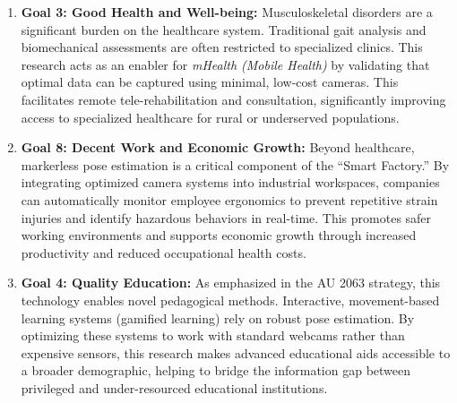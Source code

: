 \begin{enumerate}
    \item \textbf{Goal 3: Good Health and Well-being:}
    Musculoskeletal disorders are a significant burden on the healthcare system. Traditional gait analysis and biomechanical assessments are often restricted to specialized clinics. This research acts as an enabler for \textit{mHealth (Mobile Health)} by validating that optimal data can be captured using minimal, low-cost cameras. This facilitates remote tele-rehabilitation and consultation, significantly improving access to specialized healthcare for rural or underserved populations.

    \item \textbf{Goal 8: Decent Work and Economic Growth:}
    Beyond healthcare, markerless pose estimation is a critical component of the ``Smart Factory.'' By integrating optimized camera systems into industrial workspaces, companies can automatically monitor employee ergonomics to prevent repetitive strain injuries and identify hazardous behaviors in real-time. This promotes safer working environments and supports economic growth through increased productivity and reduced occupational health costs.

    \item \textbf{Goal 4: Quality Education:}
    As emphasized in the AU 2063 strategy, this technology enables novel pedagogical methods. Interactive, movement-based learning systems (gamified learning) rely on robust pose estimation. By optimizing these systems to work with standard webcams rather than expensive sensors, this research makes advanced educational aids accessible to a broader demographic, helping to bridge the information gap between privileged and under-resourced educational institutions.
\end{enumerate}